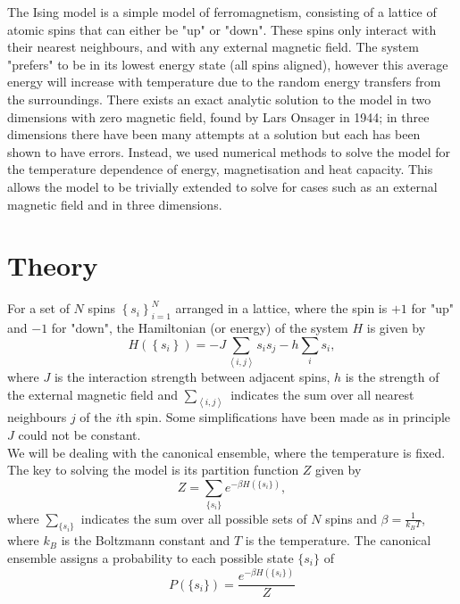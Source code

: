 \documentclass[11pt]{article}
\begin{document}
	The Ising model is a simple model of ferromagnetism, consisting of a lattice of atomic spins that can either be "up" or "down". These spins only interact with their nearest neighbours, and with any external magnetic field. The system "prefers" to be in its lowest energy state (all spins aligned), however this average energy will increase with temperature due to the random energy transfers from the surroundings. There exists an exact analytic solution to the model in two dimensions with zero magnetic field\cite{onsager_solution}, found by Lars Onsager in 1944; in three dimensions there have been many attempts at a solution\cite{das1970exact, lou2000three, zhang2007conjectures, zhang2021exact} but each has been shown to have errors. Instead, we used numerical methods to solve the model for the temperature dependence of energy, magnetisation and heat capacity. This allows the model to be trivially extended to solve for cases such as an external magnetic field and in three dimensions.
	
	\section{Theory}
	
	For a set of $N$ spins $\left\{s_i\right\}_{i=1}^N$ arranged in a lattice, where the spin is $+1$ for "up" and $-1$ for "down", the Hamiltonian (or energy)	of the system $H$ is given by\cite{Baierlein_1999} %
	\begin{equation}
		H\left(\left\{s_i\right\}\right) = -J\sum_{\left<i,j\right>}s_is_j - h\sum_i s_i,
	\end{equation}
	where $J$ is the interaction strength between adjacent spins, $h$ is the strength of the external magnetic field and $\sum_{\left<i,j\right>}$ indicates the sum over all nearest neighbours $j$ of the $i$th spin. Some simplifications have been made as in principle $J$ could not be constant. \\
	
	We will be dealing with the canonical ensemble, where the temperature is fixed. The key to solving the model is its partition function $Z$ given by
	\begin{equation} \label{eq:PartitionFunction}
		Z = \sum_{\{s_i\}} e^{-\beta H(\{s_i\})},
	\end{equation}
	where $\sum_{\{s_i\}}$ indicates the sum over all possible sets of $N$ spins and $\beta = \frac{1}{k_B T}$, where $k_B$ is the Boltzmann constant and $T$ is the temperature. The canonical ensemble assigns a probability to each possible state $\{s_i\}$ of
	\begin{equation} \label{eq:Probability}
		P(\{s_i\}) = \frac{e^{-\beta H(\{s_i\})}}{Z}
	\end{equation}
\end{document}
